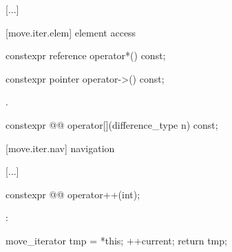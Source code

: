 [...]

\setcounter{subsubsection}{4}
[move.iter.elem]{ element access}

%
\begin{itemdecl}
constexpr reference operator*() const;
\end{itemdecl}

\begin{itemdescr}
\pnum
{}

\end{itemdescr}

%
\begin{itemdecl}
constexpr pointer operator->() const;
\end{itemdecl}

\begin{itemdescr}
\pnum
\returns {}.
\end{itemdescr}

%
\begin{itemdecl}
constexpr @@ operator[](difference_type n) const;
\end{itemdecl}

\begin{itemdescr}
\pnum
\removed{\returns }

\end{itemdescr}

[move.iter.nav]{ navigation}

[...]

\setcounter{Paras}{2}
%
\begin{itemdecl}
constexpr @@ operator++(int);
\end{itemdecl}

\begin{itemdescr}
\pnum
\effects
{}:
\begin{codeblock}
move_iterator tmp = *this;
++current;
return tmp;
\end{codeblock}
\end{itemdescr}

